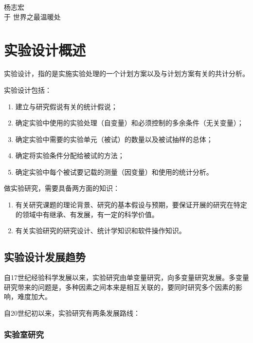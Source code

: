 \documentclass[]{ctexbook}
\providecommand{\tightlist}{%
  \setlength{\itemsep}{0pt}\setlength{\parskip}{0pt}}
\let\BeginKnitrBlock\begin \let\EndKnitrBlock\end
\begin{document}
\BeginKnitrBlock{flushright}
杨志宏\\
于 世界之最温暖处
\EndKnitrBlock{flushright}

\mainmatter

\hypertarget{intro}{%
\chapter{实验设计概述}\label{intro}}

实验设计，指的是实施实验处理的一个计划方案以及与计划方案有关的共计分析。

实验设计包括：

\begin{enumerate}
\def\labelenumi{\arabic{enumi}.}
\tightlist
\item
  建立与研究假说有关的统计假说；
\item
  确定实验中使用的实验处理（自变量）和必须控制的多余条件（无关变量）；
\item
  确定实验中需要的实验单元（被试）的数量以及被试抽样的总体；
\item
  确定将实验条件分配给被试的方法；
\item
  确定实验中每个被试要记载的测量（因变量）和使用的统计分析。
\end{enumerate}

做实验研究，需要具备两方面的知识：

\begin{enumerate}
\def\labelenumi{\arabic{enumi}.}
\tightlist
\item
  有关研究课题的理论背景、研究的基本假设与预期，要保证开展的研究在特定的领域中有继承、有发展，有一定的科学价值。
\item
  有关实验研究的研究设计、统计学知识和软件操作知识。
\end{enumerate}

\hypertarget{ux5b9eux9a8cux8bbeux8ba1ux53d1ux5c55ux8d8bux52bf}{%
\section{实验设计发展趋势}\label{ux5b9eux9a8cux8bbeux8ba1ux53d1ux5c55ux8d8bux52bf}}

自17世纪经验科学发展以来，实验研究由单变量研究，向多变量研究发展。多变量研究带来的问题是，多种因素之间本来是相互关联的，要同时研究多个因素的影响，难度加大。

自20世纪初以来，实验研究有两条发展路线：

\hypertarget{ux5b9eux9a8cux5ba4ux7814ux7a76}{%
\subsection{实验室研究}\label{ux5b9eux9a8cux5ba4ux7814ux7a76}}
\end{document}
